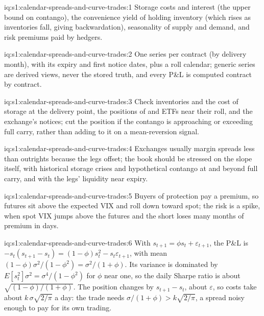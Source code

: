 \begin{solution}{iq:s1:calendar-spreads-and-curve-trades:1}
Storage costs and interest (the upper bound on contango), the convenience yield of holding inventory (which rises as inventories fall, giving
backwardation), seasonality of supply and demand, and risk premiums paid by hedgers.
\end{solution}

\begin{solution}{iq:s1:calendar-spreads-and-curve-trades:2}
One series per contract (by delivery month), with its expiry and first notice dates, plus a roll calendar; generic series are derived views, never the
stored truth, and every P\&L is computed contract by contract.
\end{solution}

\begin{solution}{iq:s1:calendar-spreads-and-curve-trades:3}
Check inventories and the cost of storage at the delivery point, the positions of  and ETFs near their roll, and the exchange's notices; cut
the position if the contango is approaching or exceeding full carry, rather than adding to it on a mean-reversion signal.
\end{solution}

\begin{solution}{iq:s1:calendar-spreads-and-curve-trades:4}
Exchanges usually margin spreads less than outrights because the legs offset; the book should be stressed on the slope itself, with historical storage
crises and hypothetical contango at and beyond full carry, and with the legs' liquidity near expiry.
\end{solution}

\begin{solution}{iq:s1:calendar-spreads-and-curve-trades:5}
Buyers of protection pay a premium, so futures sit above the expected VIX and roll down toward spot; the risk is a spike, when spot VIX jumps above the
futures and the short loses many months of premium in days.
\end{solution}

\begin{solution}{iq:s1:calendar-spreads-and-curve-trades:6}
With $s_{t+1} = \phi s_t + \varepsilon_{t+1}$, the P\&L is $-s_t(s_{t+1} - s_t) = (1 - \phi)s_t^2 - s_t\varepsilon_{t+1}$, with mean
$(1 - \phi)\sigma^2/(1 - \phi^2) = \sigma^2/(1 + \phi)$. Its variance is dominated by $E[s_t^2]\sigma^2 = \sigma^4/(1 - \phi^2)$ for $\phi$ near one, so
the daily Sharpe ratio is about $\sqrt{(1 - \phi)/(1 + \phi)}$. The position changes by $s_{t+1} - s_t$, about $\varepsilon$, so costs take about $k\,
\sigma\sqrt{2/\pi}$ a day: the trade needs $\sigma/(1 + \phi) > k\sqrt{2/\pi}$, a spread noisy enough to pay for its own trading.
\end{solution}
